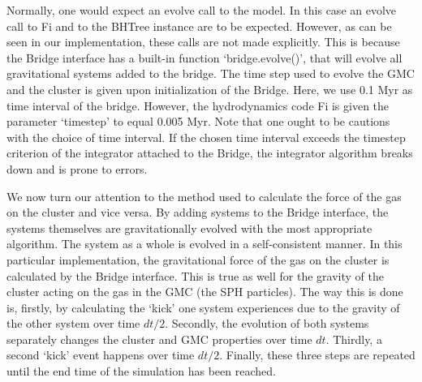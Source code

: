 \documentclass{aa}
\begin{document}
Normally, one would expect an evolve call to the model. In this case an evolve call to Fi and to the BHTree instance are to be expected. However, as can be seen in our implementation, these calls are not made explicitly. This is because the Bridge interface has a built-in function `bridge.evolve()', that will evolve all gravitational systems added to the bridge. The time step used to evolve the GMC and the cluster is given upon initialization of the Bridge. Here, we use 0.1 Myr as time interval of the bridge. However, the hydrodynamics code Fi is given the parameter `timestep' to equal 0.005 Myr. Note that one ought to be cautions with the choice of time interval. If the chosen time interval exceeds the timestep criterion of the integrator attached to the Bridge, the integrator algorithm breaks down and is prone to errors.



We now turn our attention to the method used to calculate the force of the gas on the cluster and vice versa. By adding systems to the Bridge interface, the systems themselves are gravitationally evolved with the most appropriate algorithm. The system as a whole is evolved in a self-consistent manner. In this particular implementation, the gravitational force of the gas on the cluster is calculated by the Bridge interface. This is true as well for the gravity of the cluster acting on the gas in the GMC (the SPH particles). The way this is done is, firstly, by calculating the `kick' one system experiences due to the gravity of the other system over time $dt/2$. Secondly, the evolution of both systems separately changes the cluster and GMC properties over time $dt$. Thirdly, a second `kick' event happens over time $dt/2$. Finally, these three steps are repeated until the end time of the simulation has been reached. 
\end{document}
